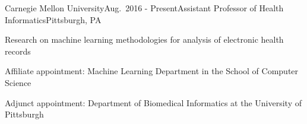 \begin{rSubsection}{Carnegie Mellon University}{Aug.\ 2016 - Present}{Assistant Professor of Health Informatics}{Pittsburgh, PA}
\item Research on machine learning methodologies for analysis of electronic health records
\item Affiliate appointment: Machine Learning Department in the School of Computer Science
\item Adjunct appointment: Department of Biomedical Informatics at the University of Pittsburgh
\end{rSubsection}


